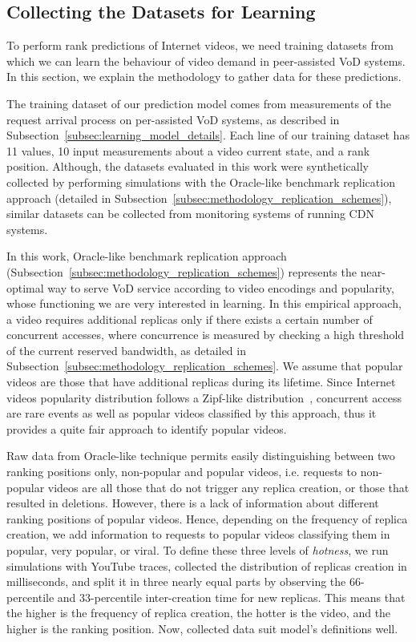 \subsection{Collecting the Datasets for Learning}
\label{subsec:methodology_training_dataset}

To perform rank predictions of Internet videos, we need training datasets from which we can learn the behaviour of video demand in peer-assisted VoD systems. In this section, we explain the methodology to gather data for these predictions. 

The training dataset of our prediction model comes from measurements of the request arrival process on per-assisted VoD systems, as described in Subsection~\ref{subsec:learning_model_details}. Each line of our training dataset has 11 values, 10 input measurements about a video current state, and a rank position. Although, the datasets evaluated in this work were synthetically collected by performing simulations with the Oracle-like benchmark replication approach (detailed in Subsection~\ref{subsec:methodology_replication_schemes}), similar datasets can be collected from monitoring systems of running CDN systems.

In this work, Oracle-like benchmark replication approach (Subsection~\ref{subsec:methodology_replication_schemes}) represents the near-optimal way to serve VoD service according to video encodings and popularity, whose functioning we are very interested in learning. In this empirical approach, a video requires additional replicas only if there exists a certain number of concurrent accesses, where concurrence is measured by checking a high threshold of the current reserved bandwidth, as detailed in Subsection~\ref{subsec:methodology_replication_schemes}. We assume that popular videos are those that have additional replicas during its lifetime. Since Internet videos popularity distribution follows a Zipf-like distribution~\cite{popularity_prediction_2010}, concurrent access are rare events as well as popular videos classified by this approach, thus it provides a quite fair approach to identify popular videos. 

Raw data from Oracle-like technique permits easily distinguishing between two ranking positions only, non-popular and popular videos, i.e. requests to non-popular videos are all those that do not trigger any replica creation, or those that resulted in deletions. However, there is a lack of information about different ranking positions of popular videos. Hence, depending on the frequency of replica creation, we add information to requests to popular videos classifying them in popular, very popular, or viral. To define these three levels of \emph{hotness}, we run simulations with YouTube traces, collected the distribution of replicas creation in milliseconds, and split it in three nearly equal parts by observing the 66-percentile and 33-percentile inter-creation time for new replicas. This means that the higher is the frequency of replica creation, the hotter is the video, and the higher is the ranking position. Now, collected data suit model's definitions well. 
